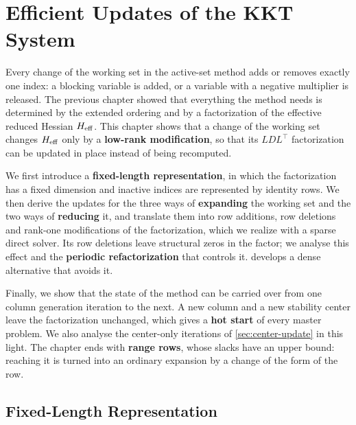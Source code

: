 \chapter{Efficient Updates of the KKT System}
\label{chap:updates}

\vspace*{\fill}

Every change of the working set in the active-set method adds or removes exactly one index:
a blocking variable is added, or a variable with a negative multiplier is released. The
previous chapter showed that everything the method needs is determined by the extended
ordering and by a factorization of the effective reduced Hessian $H_{\mathrm{eff}}$. This chapter shows
that a change of the working set changes $H_{\mathrm{eff}}$ only by a \textbf{low-rank modification}, so
that its $LDL^\top$ factorization can be updated in place instead of being recomputed.

\medskip

We first introduce a \textbf{fixed-length representation}, in which the factorization has a
fixed dimension and inactive indices are represented by identity rows. We then derive the
updates for the three ways of \textbf{expanding} the working set and the two ways of
\textbf{reducing} it, and translate them into row additions, row deletions and rank-one
modifications of the factorization, which we realize with a sparse direct solver. Its row
deletions leave structural zeros in the factor; we analyse this effect and the
\textbf{periodic refactorization} that controls it.  develops a dense
alternative that avoids it.

\medskip

Finally, we show that the state of the method can be carried over from one column generation
iteration to the next. A new column and a new stability center leave the factorization
unchanged, which gives a \textbf{hot start} of every master problem. We also analyse the
center-only iterations of \cref{sec:center-update} in this light. The chapter ends with
\textbf{range rows}, whose slacks have an upper bound: reaching it is turned into an ordinary
expansion by a change of the form of the row.

\vspace*{\fill}

\newpage


\section{Fixed-Length Representation}
\label{sec:fixed-length}

